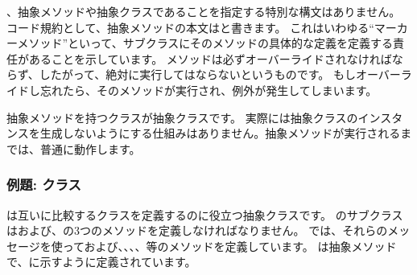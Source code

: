 \documentclass[a4paper,10pt,twoside]{book}
\begin{document}
、抽象メソッドや抽象クラスであることを指定する特別な構文はありません。
コード規約として、抽象メソッドの本文は\mbox{}と書きます。
これはいわゆる``マーカーメソッド''といって、サブクラスにそのメソッドの具体的な定義を定義する責任があることを示しています。
メソッドは必ずオーバーライドされなければならず、したがって、絶対に実行してはならないというものです。
もしオーバーライドし忘れたら、そのメソッドが実行され、例外が発生してしまいます。

抽象メソッドを持つクラスが抽象クラスです。
実際には抽象クラスのインスタンスを生成しないようにする仕組みはありません。抽象メソッドが実行されるまでは、普通に動作します。

\subsubsection{例題: クラス}
は互いに比較するクラスを定義するのに役立つ抽象クラスです。
のサブクラスは\ct{<}および\ct{=}、の3つのメソッドを定義しなければなりません。
では、それらのメッセージを使って\ct{>}および\ct{>=}、\ct{<=}、、、等のメソッドを定義しています。
は抽象メソッドで、に示すように定義されています。
\end{document}
